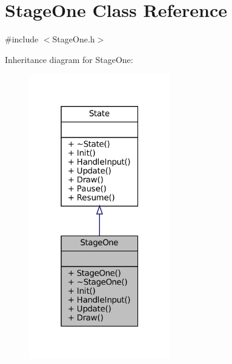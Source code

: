 \hypertarget{classStageOne}{}\section{Stage\+One Class Reference}
\label{classStageOne}


{\ttfamily \#include $<$Stage\+One.\+h$>$}



Inheritance diagram for Stage\+One\+:\nopagebreak
\begin{figure}[H]
\begin{center}
\leavevmode
\includegraphics[width=175pt]{classStageOne__inherit__graph}
\end{center}
\end{figure}


